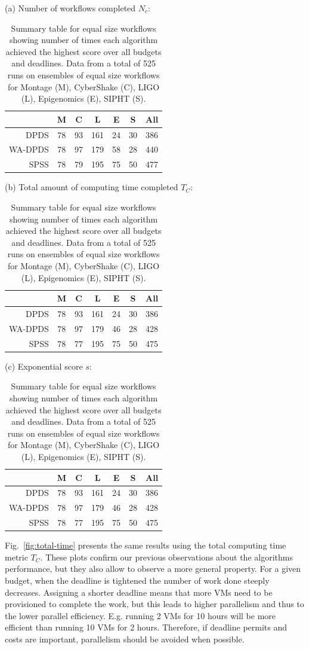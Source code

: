 \documentclass{sig-alternate}
\begin{document}

\begin{table}[tb]
\centering

(a) Number of workflows completed $N_c$:
\medskip
\begin{tabular}{r|cccccc}
 & M & C & L & E & S & All\tabularnewline
\hline
DPDS      &   78 &  93 & 161 &  24  & 30 & 386\tabularnewline
WA-DPDS   &    78  & 97 & 179  & 58  & 28 & 440\tabularnewline
SPSS     &    78  & 79 & 195 &  75 &  50 & 477\tabularnewline
\end{tabular}
\medskip

(b) Total amount of computing time completed $T_C$:
\medskip
\begin{tabular}{r|cccccc}
 & M & C & L & E & S & All\tabularnewline
\hline
DPDS      &   78 &  93 & 161 &  24 &  30 & 386\tabularnewline
WA-DPDS   &    78  & 97 & 179 &  46  & 28 & 428\tabularnewline
SPSS     &    78 &  77 & 195  & 75 &  50 & 475\tabularnewline
\end{tabular}
\medskip

(c) Exponential score $s$:
\medskip
\begin{tabular}{r|cccccc}
 & M & C & L & E & S & All\tabularnewline
\hline
DPDS      &   78  & 93 & 161 &  24 &  30 & 386\tabularnewline
WA-DPDS   &    78 &  97 & 179  & 46  & 28 & 428\tabularnewline
SPSS     &    78 &  77 & 195 &  75  & 50 & 475\tabularnewline
\end{tabular}
\medskip

\caption{Summary table for equal size workflows showing number of times each
algorithm achieved the highest score over all budgets and deadlines. Data from a total of 525 runs on 
ensembles of equal size workflows for Montage (M), CyberShake (C), LIGO (L), 
Epigenomics (E), SIPHT (S).
\label{tab:num-dags-equal}}
\end{table}




Fig.~\ref{fig:total-time} presents the same results using the total computing
time metric $T_C$. These plots confirm our previous observations about the
algorithms performance, but they also allow to observe a more general property.
For a given budget, when the deadline is tightened the number of work done
steeply decreases. Assigning a shorter deadline means that more VMs need to be
provisioned to complete the work, but this leads to higher parallelism and thus
to the lower parallel efficiency. E.g. running 2 VMs for 10 hours will be more
efficient than running 10 VMs for 2 hours. Therefore, if deadline permits and
costs are important, parallelism should be avoided when possible.
\end{document}
